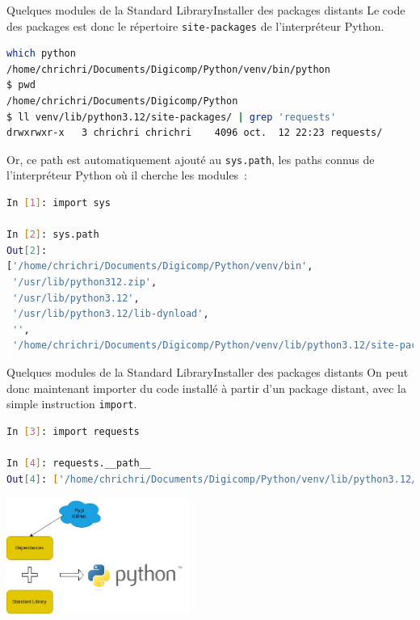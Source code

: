 \documentclass{beamer}
\begin{document}
    \begin{frame}[fragile]{Quelques modules de la Standard Library}{Installer des packages distants}
        Le code des packages est donc le répertoire \lstinline{site-packages} de l'interpréteur Python.
        \begin{lstlisting}[language=Bash]
which python
/home/chrichri/Documents/Digicomp/Python/venv/bin/python
$ pwd
/home/chrichri/Documents/Digicomp/Python
$ ll venv/lib/python3.12/site-packages/ | grep 'requests'
drwxrwxr-x   3 chrichri chrichri    4096 oct.  12 22:23 requests/
        \end{lstlisting}
        Or, ce path est automatiquement ajouté au \lstinline{sys.path}, les paths connus de l'interpréteur Python où il cherche les modules~:
        \begin{lstlisting}[language=Bash]
In [1]: import sys

In [2]: sys.path
Out[2]:
['/home/chrichri/Documents/Digicomp/Python/venv/bin',
 '/usr/lib/python312.zip',
 '/usr/lib/python3.12',
 '/usr/lib/python3.12/lib-dynload',
 '',
 '/home/chrichri/Documents/Digicomp/Python/venv/lib/python3.12/site-packages']
        \end{lstlisting}
    \end{frame}

    \begin{frame}[fragile]{Quelques modules de la Standard Library}{Installer des packages distants}
        On peut donc maintenant importer du code installé à partir d'un package distant, avec la simple instruction \lstinline{import}.
        \begin{lstlisting}[language=Bash]
In [3]: import requests

In [4]: requests.__path__
Out[4]: ['/home/chrichri/Documents/Digicomp/Python/venv/lib/python3.12/site-packages/requests']
        \end{lstlisting}
        \bigbreak
        \begin{center}
            \includegraphics[width=6cm]{image/std-plus-dependencies}
        \end{center}
    \end{frame}
\end{document}
